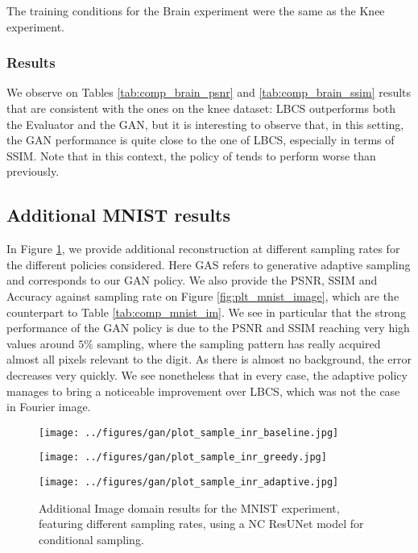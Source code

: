 The training conditions for the Brain experiment were the same as the Knee experiment. 

\subsubsection{Results}
We observe on Tables \ref{tab:comp_brain_psnr} and \ref{tab:comp_brain_ssim} results that are consistent with the ones on the knee dataset: LBCS outperforms both the Evaluator and the GAN, but it is interesting to observe that, in this setting, the GAN performance is quite close to the one of LBCS, especially in terms of SSIM. Note that in this context, the policy of \citet{bakker2020experimental} tends to perform worse than previously.




\clearpage
\FloatBarrier

\subsection{Additional MNIST results}\label{app:s_mnist}
In Figure \ref{fig:mnist_image2}, we provide additional reconstruction at different sampling rates for the different policies considered. Here  GAS refers to generative adaptive sampling and corresponds to our GAN policy. We also provide the PSNR, SSIM and Accuracy against sampling rate on Figure \ref{fig:plt_mnist_image}, which are the counterpart to Table \ref{tab:comp_mnist_im}. We see in particular that the strong performance of the GAN policy is due to the PSNR and SSIM reaching very high values around $5\%$ sampling, where the sampling pattern has really acquired almost all pixels relevant to the digit. As there is almost no background, the error decreases very quickly. We see nonetheless that in every case, the adaptive policy manages to bring a noticeable improvement over LBCS, which was not the case in Fourier image. 

\begin{figure}[!ht]
    \centering
    \texttt{[image: ../figures/gan/plot\_sample\_inr\_baseline.jpg]}
    
    \texttt{[image: ../figures/gan/plot\_sample\_inr\_greedy.jpg]}
    
    \texttt{[image: ../figures/gan/plot\_sample\_inr\_adaptive.jpg]}
\caption{Additional Image domain results for the MNIST experiment, featuring different sampling rates, using a NC ResUNet model for conditional sampling.}\label{fig:mnist_image2}
\end{figure}

